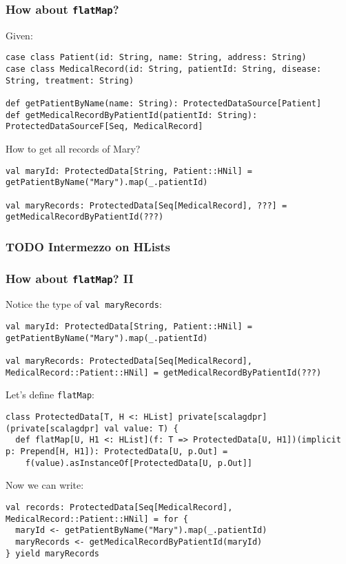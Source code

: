 \documentclass[aspectratio=169]{beamer}
\begin{document}
\begin{frame}[fragile]
\frametitle{How about \texttt{flatMap}?}

Given:

\begin{lstlisting}[style=myScalastyle,frame=none]
case class Patient(id: String, name: String, address: String)
case class MedicalRecord(id: String, patientId: String, disease: String, treatment: String)

def getPatientByName(name: String): ProtectedDataSource[Patient]
def getMedicalRecordByPatientId(patientId: String): ProtectedDataSourceF[Seq, MedicalRecord]
\end{lstlisting}

How to get all records of Mary?
\pause


\begin{lstlisting}[style=myScalastyle,frame=none]
val maryId: ProtectedData[String, Patient::HNil] = getPatientByName("Mary").map(_.patientId)

val maryRecords: ProtectedData[Seq[MedicalRecord], ???] = getMedicalRecordByPatientId(???)
\end{lstlisting}


\end{frame}

\begin{frame}[fragile]
\frametitle{TODO Intermezzo on HLists}

\end{frame}

\begin{frame}[fragile]
\frametitle{How about \texttt{flatMap}? II}
Notice the type of \texttt{val maryRecords}:
\begin{lstlisting}[style=myScalastyle,frame=none]
val maryId: ProtectedData[String, Patient::HNil] = getPatientByName("Mary").map(_.patientId)

val maryRecords: ProtectedData[Seq[MedicalRecord], MedicalRecord::Patient::HNil] = getMedicalRecordByPatientId(???)
\end{lstlisting}
\pause
Let's define \texttt{flatMap}:
\begin{lstlisting}[style=myScalastyle,frame=none]
class ProtectedData[T, H <: HList] private[scalagdpr](private[scalagdpr] val value: T) {
  def flatMap[U, H1 <: HList](f: T => ProtectedData[U, H1])(implicit p: Prepend[H, H1]): ProtectedData[U, p.Out] =
    f(value).asInstanceOf[ProtectedData[U, p.Out]]
\end{lstlisting}
\pause
Now we can write:
\begin{lstlisting}[style=myScalastyle,frame=none]
val records: ProtectedData[Seq[MedicalRecord], MedicalRecord::Patient::HNil] = for {
  maryId <- getPatientByName("Mary").map(_.patientId)
  maryRecords <- getMedicalRecordByPatientId(maryId)
} yield maryRecords
\end{lstlisting}

\end{frame}
\end{document}
